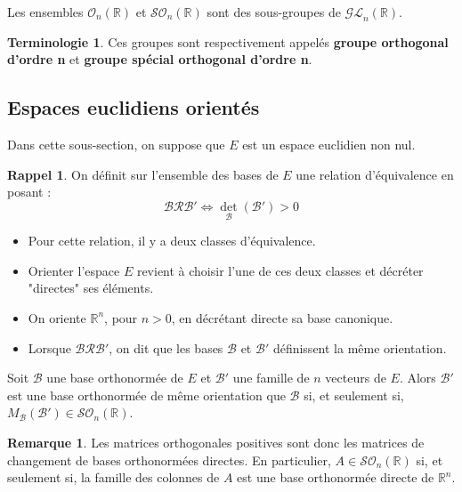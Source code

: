 \documentclass[french]{article}
\newcommand{\R}{\mathbb{R}}
\theoremstyle{plain}
\theoremstyle{definition}
\newtheorem*{rmq}{Remarque}
\newtheorem*{rappel}{Rappel}
\newtheorem*{terminologie}{Terminologie}
\theoremstyle{remark}
\begin{document}
\begin{prop}
	Les ensembles $\mathcal{O}_n(\R)$ et $\mathcal{SO}_n(\R)$ sont des sous-groupes de $\mathcal{GL}_n(\R)$.
\end{prop}

\begin{terminologie}
	Ces groupes sont respectivement appelés \textbf{groupe orthogonal d'ordre n} et \textbf{groupe spécial orthogonal d'ordre n}.
\end{terminologie}

\subsection{Espaces euclidiens orientés}

Dans cette sous-section, on suppose que $E$ est un espace euclidien non nul.

\begin{rappel}
	On définit sur l'ensemble des bases de $E$ une relation d'équivalence en posant :
$$\mathcal{B}\mathcal{R}\mathcal{B}'\iff \det_\mathcal{B}(\mathcal{B}')>0$$
\begin{itemize}
	\item Pour cette relation, il y a deux classes d'équivalence.
	\item Orienter l'espace $E$ revient à choisir l'une de ces deux classes et décréter "directes" ses éléments.
	\item On oriente $\R^n$, pour $n>0$, en décrétant directe sa base canonique.
	\item Lorsque $\mathcal{B}\mathcal{R}\mathcal{B}'$, on dit que les bases $\mathcal{B}$ et $\mathcal{B}'$ définissent la même orientation.
\end{itemize}
\end{rappel}

\begin{prop}
	Soit $\mathcal{B}$ une base orthonormée de $E$ et $\mathcal{B}'$ une famille de $n$ vecteurs de $E$. Alors $\mathcal{B}'$ est une base orthonormée de même orientation que $\mathcal{B}$ si, et seulement si, $M_\mathcal{B}(\mathcal{B}')\in\mathcal{SO}_n(\R)$.
\end{prop}

\begin{rmq}
	Les matrices orthogonales positives sont donc les matrices de changement de bases orthonormées directes. En particulier, $A\in\mathcal{SO}_n(\R)$ si, et seulement si, la famille des colonnes de $A$ est une base orthonormée directe de $\R^n$.
\end{rmq}
\end{document}
